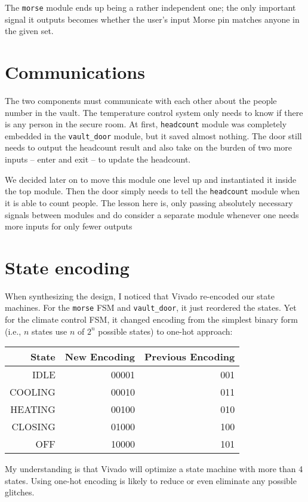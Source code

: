 \documentclass[4apaper,12pt]{article}
\begin{document}
The \texttt{morse} module ends up being a rather independent one; the only important signal it outputs becomes whether the user's input Morse pin matches anyone in the given set.

\section{Communications}
The two components must communicate with each other about the people number in the vault. The temperature control system only needs to know if there is any person in the secure room.  At first, \texttt{headcount} module was completely embedded in the \texttt{vault\_door} module, but it saved almost nothing.  The door still needs to output the headcount result and also take on the burden of two more inputs -- enter and exit -- to update the headcount.

We decided later on to move this module one level up and instantiated it inside the top module.  Then the door simply needs to tell the \texttt{headcount} module when it is able to count people.  The lesson here is, only passing absolutely necessary signals between modules and do consider a separate module whenever one needs more inputs for only fewer outputs

\section{State encoding}
When synthesizing the design, I noticed that Vivado re-encoded our state machines.  For the \texttt{morse} FSM and \texttt{vault\_door}, it just reordered the states.  Yet for the climate control FSM, it changed encoding from the simplest binary form (i.e., $n$ states use $n$ of $2^{n}$ possible states) to one-hot approach:

\begin{table}[h]
  \centering
\begin{tabular}{rrr}
 \hline
  State &    New Encoding &  Previous Encoding  \\
  \hline
  IDLE &      00001 &         001 \\
  COOLING &   00010 &         011 \\
  HEATING &   00100 &         010 \\
  CLOSING &   01000 &         100 \\
      OFF &   10000 &         101 \\
  \hline
\end{tabular}
\end{table}
My understanding is that Vivado will optimize a state machine with more than 4 states. Using one-hot encoding is likely to reduce or even eliminate any possible glitches.
\end{document}
